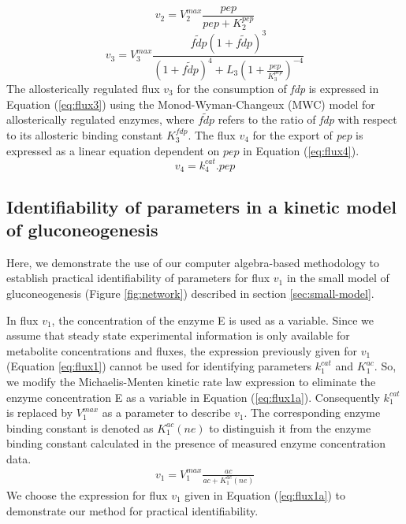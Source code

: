 \documentclass[10pt]{article}
\begin{document}
	\begin{equation}\label{eq:flux2}
	v_2 = V_{2}^{max}\frac{pep}{pep+K_{2}^{pep}}
	\end{equation}
	\begin{equation}\label{eq:flux3}
	v_3 = V_{3}^{max}\frac{\tilde{fdp}\left(1+\tilde{fdp}\right)^3}{\left(1+\tilde{fdp}\right)^4+L_3\left(1+\frac{pep}{K_{3}^{pep}}\right)^{-4}}
	\end{equation}
	The allosterically regulated flux $v_3$ for the consumption of \textit{fdp} is expressed in Equation (\ref{eq:flux3}) using the Monod-Wyman-Changeux (MWC) model for allosterically regulated enzymes, where $\tilde{fdp}$ refers to the ratio of \textit{fdp} with respect to its allosteric binding constant $K_{3}^{fdp}$. The flux $v_4$ for the export of \textit{pep} is expressed as a linear equation dependent on $pep$ in Equation (\ref{eq:flux4}).
	\begin{equation}\label{eq:flux4}
	v_4 = k_{4}^{cat}.pep
	\end{equation}
	
	\subsection{Identifiability of parameters in a kinetic model of gluconeogenesis}\label{sec:example}
	Here, we demonstrate the use of our computer algebra-based methodology to establish practical identifiability of parameters for flux $v_1$ in the small model of gluconeogenesis (Figure \ref{fig:network}) described in section \ref{sec:small-model}. 
	
	In flux $v_1$, the concentration of the enzyme E is used as a variable. Since we assume that steady state experimental information is only available for metabolite concentrations and fluxes, the expression previously given for $v_1$ (Equation \ref{eq:flux1}) cannot be used for identifying parameters $k_1^{cat}$ and $K_1^{ac}$. So, we modify the Michaelis-Menten kinetic rate law expression to eliminate the enzyme concentration E as a variable in Equation (\ref{eq:flux1a}). Consequently $k_1^{cat}$ is replaced by $V_1^{max}$ as a parameter to describe $v_1$. The corresponding enzyme binding constant is denoted as $K_1^{ac} (ne)$ to distinguish it from the enzyme binding constant calculated in the presence of measured enzyme concentration data.
	\begin{align}\label{eq:flux1a}
	v_1 = V_1^{max}\frac{ac}{ac+K_{1}^{ac}(ne)}
	\end{align}		
	We choose the expression for flux $v_1$ given in Equation (\ref{eq:flux1a}) to demonstrate our method for practical identifiability. 
	
\end{document}
